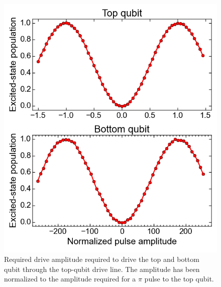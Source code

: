       \begin{figure}
        \begin{center}
        \vspace{-30pt}
          \includegraphics[width=\textwidth]{Figures/Exploring frequency reuse/cross-driving_Rabi.png}
        \end{center}
        \vspace{-20 pt}
        \caption{Required drive amplitude required to drive the top and bottom qubit through the top-qubit drive line. The amplitude has been normalized to the amplitude required for a $\pi$ pulse to the top qubit.}
        \label{fig:cross-driving Rabi}
      \end{figure}


